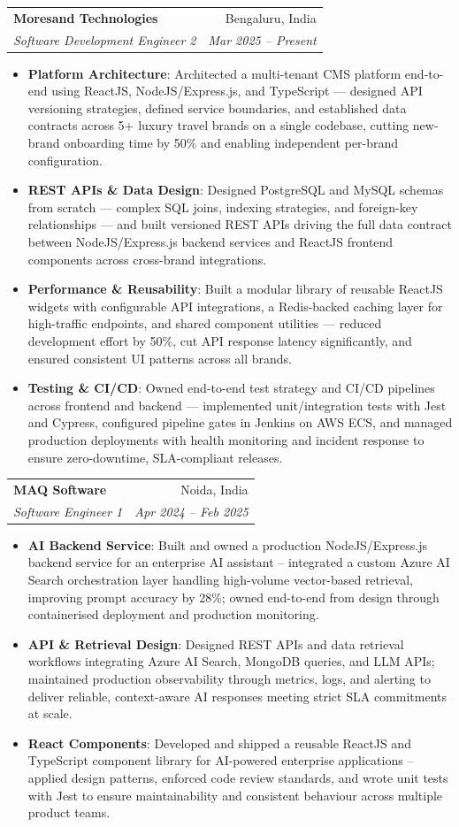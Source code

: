 \documentclass[a4paper,20pt]{article}
\makeatletter
\newcommand{\resumeItem}[2]{\item\small{\textbf{#1}{: #2 \vspace{-2pt}}}}
\newcommand{\resumeSubheading}[4]{\vspace{-1pt}\item\begin{tabular*}{0.97\textwidth}{l@{\extracolsep{\fill}}r}\textbf{#1} & #2 \\\textit{#3} & \textit{#4} \\\end{tabular*}\vspace{-5pt}}
\newcommand{\resumeItemListStart}{\begin{itemize}}
\newcommand{\resumeItemListEnd}{\end{itemize}\vspace{-5pt}}
\makeatother
\begin{document}
    \resumeSubheading
      {Moresand Technologies}{Bengaluru, India}
      {Software Development Engineer 2}{Mar 2025 -- Present}
      \resumeItemListStart
        \resumeItem{Platform Architecture}
          {Architected a multi-tenant CMS platform end-to-end using ReactJS, NodeJS/Express.js, and TypeScript — designed API versioning strategies, defined service boundaries, and established data contracts across 5+ luxury travel brands on a single codebase, cutting new-brand onboarding time by 50\% and enabling independent per-brand configuration.}
        \resumeItem{REST APIs \& Data Design}
          {Designed PostgreSQL and MySQL schemas from scratch — complex SQL joins, indexing strategies, and foreign-key relationships — and built versioned REST APIs driving the full data contract between NodeJS/Express.js backend services and ReactJS frontend components across cross-brand integrations.}
        \resumeItem{Performance \& Reusability}
          {Built a modular library of reusable ReactJS widgets with configurable API integrations, a Redis-backed caching layer for high-traffic endpoints, and shared component utilities — reduced development effort by 50\%, cut API response latency significantly, and ensured consistent UI patterns across all brands.}
        \resumeItem{Testing \& CI/CD}
          {Owned end-to-end test strategy and CI/CD pipelines across frontend and backend — implemented unit/integration tests with Jest and Cypress, configured pipeline gates in Jenkins on AWS ECS, and managed production deployments with health monitoring and incident response to ensure zero-downtime, SLA-compliant releases.}
      \resumeItemListEnd

    \resumeSubheading
      {MAQ Software}{Noida, India}
      {Software Engineer 1}{Apr 2024 -- Feb 2025}
      \resumeItemListStart
        \resumeItem{AI Backend Service}
          {Built and owned a production NodeJS/Express.js backend service for an enterprise AI assistant -- integrated a custom Azure AI Search orchestration layer handling high-volume vector-based retrieval, improving prompt accuracy by 28\%; owned end-to-end from design through containerised deployment and production monitoring.}
        \resumeItem{API \& Retrieval Design}
          {Designed REST APIs and data retrieval workflows integrating Azure AI Search, MongoDB queries, and LLM APIs; maintained production observability through metrics, logs, and alerting to deliver reliable, context-aware AI responses meeting strict SLA commitments at scale.}
        \resumeItem{React Components}
          {Developed and shipped a reusable ReactJS and TypeScript component library for AI-powered enterprise applications -- applied design patterns, enforced code review standards, and wrote unit tests with Jest to ensure maintainability and consistent behaviour across multiple product teams.}
      \resumeItemListEnd
\end{document}
